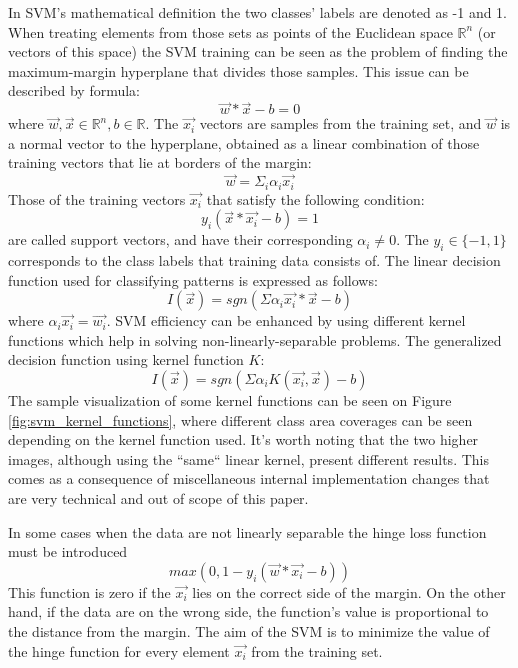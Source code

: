In SVM's mathematical definition the two classes' labels are denoted as -1 and 1. When treating elements from those sets as points of the Euclidean space $\mathbb{R}^{n}$ (or vectors of this space) the SVM training can be seen as the problem of finding the maximum-margin hyperplane that divides those samples. This issue can be described by formula: \[ \vec{w} * \vec{x} - b = 0 \] where $\vec{w}, \vec{x} \in \mathbb{R}^{n}, b \in \mathbb{R}$. The $\vec{x_{i}}$ vectors are samples from the training set, and $\vec{w}$ is a normal vector to the hyperplane, obtained as a linear combination of those training vectors that lie at borders of the margin: \[ \vec{w} = \Sigma_{i}\alpha_{i}\vec{x_{i}} \] Those of the training vectors $\vec{x_{i}}$ that satisfy the following condition: \[ y_{i}(\vec{x} * \vec{x_{i}} - b) = 1\] are called support vectors, and have their corresponding $\alpha_{i} \neq 0$. The $y_{i} \in \{-1, 1\}$ corresponds to the class labels that training data consists of. The linear decision function used for classifying patterns is expressed as follows: \[I(\vec{x}) = sgn(\Sigma\alpha_{i}\vec{x_{i}} * \vec{x} - b)\] where $\alpha_{i}\vec{x_{i}} = \vec{w_{i}}$. SVM efficiency can be enhanced by using different kernel functions which help in solving non-linearly-separable problems. The generalized decision function using kernel function $K$: \[I(\vec{x}) = sgn(\Sigma\alpha_{i}K(\vec{x_{i}},\vec{x}) - b)\] The sample visualization of some kernel functions can be seen on Figure \ref{fig:svm_kernel_functions}, where different class area coverages can be seen depending on the kernel function used. It's worth noting that the two higher images, although using the ``same`` linear kernel, present different results. This comes as a consequence of miscellaneous internal implementation changes that are very technical and out of scope of this paper. 

In some cases when the data are not linearly separable the hinge loss function must be introduced \[max(0, 1 - y_{i}(\vec{w}*\vec{x_{i}} - b))\] This function is zero if the $\vec{x_{i}}$ lies on the correct side of the margin. On the other hand, if the data are on the wrong side, the function's value is proportional to the distance from the margin. The aim of the SVM is to minimize the value of the hinge function for every element $\vec{x_{i}}$ from the training set.

